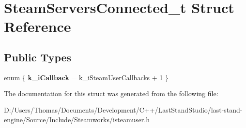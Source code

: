 \hypertarget{structSteamServersConnected__t}{}\section{Steam\+Servers\+Connected\+\_\+t Struct Reference}
\label{structSteamServersConnected__t}
\subsection*{Public Types}
\begin{DoxyCompactItemize}
\item 
\hypertarget{structSteamServersConnected__t_adab2eacb95a98e1a128e69134b3512c1}{}enum \{ {\bfseries k\+\_\+i\+Callback} = k\+\_\+i\+Steam\+User\+Callbacks + 1
 \}\label{structSteamServersConnected__t_adab2eacb95a98e1a128e69134b3512c1}

\end{DoxyCompactItemize}


The documentation for this struct was generated from the following file\+:\begin{DoxyCompactItemize}
\item 
D\+:/\+Users/\+Thomas/\+Documents/\+Development/\+C++/\+Last\+Stand\+Studio/last-\/stand-\/engine/\+Source/\+Include/\+Steamworks/isteamuser.\+h\end{DoxyCompactItemize}
